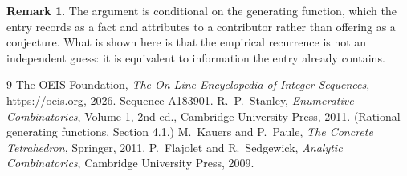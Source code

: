 \documentclass[11pt,a4paper]{article}
\theoremstyle{plain}
\theoremstyle{definition}
\newtheorem{remark}[theorem]{Remark}
\begin{document}
\begin{remark}
The argument is conditional on the generating function, which the entry records as a fact and
attributes to a contributor rather than offering as a conjecture. What is shown here is that
the empirical recurrence is not an independent guess: it is equivalent to information the
entry already contains.
\end{remark}

\begin{thebibliography}{9}
 The OEIS Foundation, \emph{The On-Line Encyclopedia of Integer
Sequences}, \url{https://oeis.org}, 2026. Sequence A183901.
 R.~P.~Stanley, \emph{Enumerative Combinatorics}, Volume 1, 2nd ed.,
Cambridge University Press, 2011. (Rational generating functions, Section 4.1.)
 M.~Kauers and P.~Paule, \emph{The Concrete Tetrahedron}, Springer, 2011.
 P.~Flajolet and R.~Sedgewick, \emph{Analytic Combinatorics}, Cambridge
University Press, 2009.
\end{thebibliography}
\end{document}
